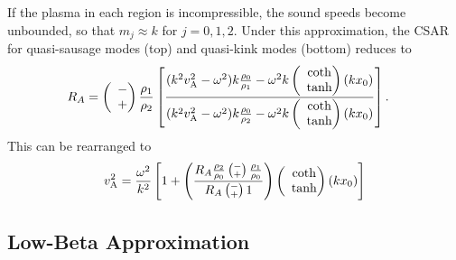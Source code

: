\documentclass[namedreferences]{solarphysics}
\numberwithin{equation}{section}
\begin{document}
\begin{article}
If the plasma in each region is incompressible, the sound speeds become unbounded, so that $m_j \approx k$ for $j = 0,1,2$. Under this approximation, the CSAR for quasi-sausage modes (top) and quasi-kink modes (bottom) reduces to
\begin{align}
R_A &= \left(\hspace{-0.07in}\begin{matrix} &- \\ &+ \end{matrix}\right) \frac{\rho_1}{\rho_2} \left[ \frac{(k^2v_\textrm{A}^2-\omega^2)k\frac{\rho_0}{\rho_1}-\omega^2k \left(\hspace{-0.07in}\begin{matrix} &\coth \\ &\tanh \end{matrix}\right)(kx_0)}{(k^2v_\textrm{A}^2-\omega^2)k\frac{\rho_0}{\rho_2}-\omega^2k \left(\hspace{-0.07in}\begin{matrix} &\coth \\ &\tanh \end{matrix}\right)(kx_0)} \right].
\end{align}
This can be rearranged to
\begin{equation}
v_\textrm{A}^2 = \frac{\omega^2}{k^2} \left[ 1 + \left( \frac{R_A \frac{\rho_2}{\rho_0} \left(\substack{- \\ +}\right) \frac{\rho_1}{\rho_0}}{R_A \left(\substack{- \\ +}\right) 1} \right) \left(\hspace{-0.07in}\begin{matrix} &\coth \\ &\tanh \end{matrix}\right) (kx_0)\right]
\end{equation}

\subsection{Low-Beta Approximation} \label{sec: low-beta}


\end{article}
\end{document}
